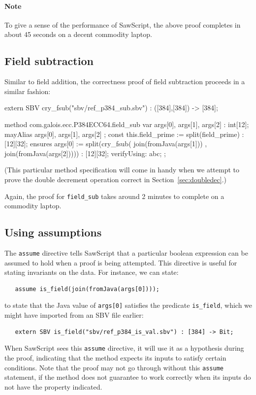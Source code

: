 \documentclass[12pt]{galois-whitepaper}
\newcommand{\sawScript}{{\sc SawScript}\xspace}
\begin{document}
\paragraph{Note} To give a sense of the performance of \sawScript, the above proof completes in about 45 seconds on a decent commodity laptop.

\subsection{Field subtraction}
Similar to field addition, the correctness proof of field subtraction proceeds in a similar fashion:

\begin{code}
  extern SBV cry_fsub("sbv/ref_p384_sub.sbv") : ([384],[384]) -> [384];

  method com.galois.ecc.P384ECC64.field_sub {
    var args[0], args[1], args[2] : int[12];
    mayAlias { args[0], args[1], args[2] };
    const this.field_prime := split(field_prime) : [12][32];
    ensures args[0] :=
         split(cry_fsub( join(fromJava(args[1]))
                       , join(fromJava(args[2])))) : [12][32];
    verifyUsing: abc;
  };
\end{code}

(This particular method specification will come in handy when we attempt to prove the double decrement operation correct in Section~\ref{sec:doubledec}.)

Again, the proof for {\tt field\_sub} takes around 2 minutes to complete on a commodity laptop.

\subsection{Using assumptions}

The {\tt assume} directive tells \sawScript that a particular boolean expression can be assumed to hold when a proof is being attempted. This directive is
useful for stating invariants on the data. For instance, we can state:
\begin{Verbatim}
   assume is_field(join(fromJava(args[0]))); 
\end{Verbatim}
to state that the Java value of {\tt args[0]} satisfies the predicate {\tt is\_field}, which we might have
imported from an SBV file earlier:
\begin{Verbatim}
   extern SBV is_field("sbv/ref_p384_is_val.sbv") : [384] -> Bit;
\end{Verbatim}
When \sawScript sees this {\tt assume} directive, it will use it as a hypothesis during the proof, indicating that the method expects its inputs to
satisfy certain conditions. Note that the proof may not go through without this {\tt assume} statement, if the method does not guarantee to work
correctly when its inputs do not have the property indicated.
\end{document}
